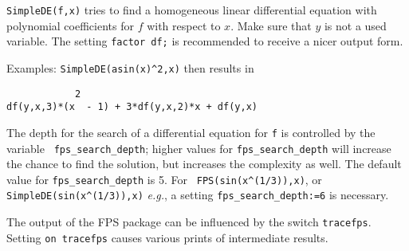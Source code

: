 {\tt SimpleDE(f,x)} tries to find a homogeneous linear differential
equation with polynomial coefficients for $f$ with respect to $x$.
Make sure that $y$ is not a used variable.
The setting {\tt factor df;} is recommended to receive a nicer output form.

Examples: {\tt SimpleDE(asin(x)\verb+^+2,x)} then results in
\begin{verbatim}
            2
df(y,x,3)*(x  - 1) + 3*df(y,x,2)*x + df(y,x)
\end{verbatim}

The depth for the search of a differential equation for {\tt f} is
controlled by the variable {\tt
fps\verb+_+search\verb+_+depth}; higher
values for {\tt fps\verb+_+search\verb+_+depth} will increase the
chance to find the solution, but increases the complexity as well. The
default value for {\tt fps\verb+_+search\verb+_+depth} is 5.  For {\tt
FPS(sin(x\verb+^+(1/3)),x)}, or {\tt SimpleDE(sin(x\verb+^+(1/3)),x)}
{\em e.g.}, a setting {\tt fps\verb+_+search\verb+_+depth:=6} is necessary.

The output of the FPS package can be influenced by the
switch {\tt tracefps}.  Setting {\tt on tracefps} causes various
prints of intermediate results.

